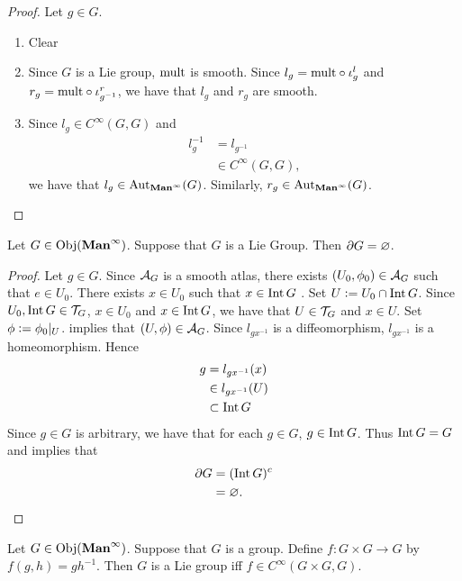 \documentclass{book}
\begin{document}
\begin{proof} Let $g \in G$.
	\begin{enumerate}
		\item Clear
		\item Since $G$ is a Lie group, $\text{mult}$ is smooth. Since $l_g = \text{mult} \circ \iota^l_g$ and $r_g = \text{mult} \circ \iota^r_{g^{-1}}$, we have that $l_g$ and $r_g$ are smooth.
		\item Since $l_g \in  C^{\infty}(G, G)$ and 
		\begin{align*}
			l_g^{-1}
			& = l_{g^{-1}} \\
			& \in  C^{\infty}(G, G),
		\end{align*}
		we have that $l_g \in \operatorname{Aut}_{\operatorname*{\text{\textbf{Man}}^{\infty}}}(G)$. Similarly, $r_g \in \operatorname{Aut}_{\operatorname*{\text{\textbf{Man}}^{\infty}}}(G)$.
	\end{enumerate}
\end{proof}

\begin{ex}
	Let $G \in \operatorname{Obj}(\operatorname*{\text{\textbf{Man}}^{\infty}})$. Suppose that $G$ is a Lie Group. Then $\partial G = \varnothing$. 
\end{ex}

\begin{proof}
	Let $g \in G$. Since $\mathcal{A}_G$ is a smooth atlas, there exists $(U_0, \phi_0) \in \mathcal{A}_G$ such that $e \in U_0$. There exists $x \in U_0$ such that $x \in \operatorname{Int} G$ . Set $U \vcentcolon= U_0 \cap \operatorname{Int} G$. Since $U_0, \operatorname{Int} G \in \mathcal{T}_G$, $x \in U_0$ and $x \in \operatorname{Int} G$, we have that $U \in \mathcal{T}_G$ and $x \in U$. Set $\phi \vcentcolon= \phi_0|_U$.   implies that $(U, \phi) \in \mathcal{A}_G$. Since $l_{gx^{-1}}$ is a diffeomorphism, $l_{gx^{-1}}$ is a homeomorphism. Hence 
	\begin{align*}
		g
		& = l_{gx^{-1}}(x) \\
		& \in l_{gx^{-1}}(U) \\
		& \subset \operatorname{Int} G
	\end{align*}
	Since $g \in G$ is arbitrary, we have that for each $g \in G$, $g \in \operatorname{Int} G$. Thus $\operatorname{Int} G = G$ and   implies that 
	\begin{align*}
		\partial G 
		& = (\operatorname{Int} G)^c \\
		& = \varnothing.
	\end{align*} 
\end{proof}

\begin{ex}
	Let $G \in \operatorname{Obj}(\operatorname*{\text{\textbf{Man}}^{\infty}})$. Suppose that $G$ is a group. Define $f:G \times G \rightarrow G$ by $f(g, h) = g h^{-1}$. Then $G$ is a Lie group iff $f \in  C^{\infty}(G \times G, G)$. 
\end{ex}
\end{document}
